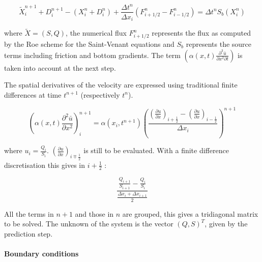\begin{equation}
 \tilde{X}^{n+1}_i + D_i^{n+1} - \left(X^n_i + D_i^n\right) + \frac{\Delta t^n}{\Delta x_i}\left(F^n_{i+1/2} - F^n_{i-1/2}\right) = \Delta t^n S_b(X^n_i) \label{eq:model_dis}
\end{equation}

\vspace{0.5cm}

where $\tilde{X}=(S,Q)$, the numerical flux $F^n_{i+1/2}$ represents the flux as computed by the Roe scheme for the Saint-Venant equations and $S_b$ represents the source terms including friction and bottom gradients.
The term $\left(\alpha(x,t)\frac{\partial^3{\bar{u}}}{\partial{{x}^2}\partial{t}}\right)$ is taken into account at the next step.

\vspace{0.5cm}

The spatial derivatives of the velocity are expressed using traditional finite differences at time $t^{n+1}$ (respectively $t^n$).

\begin{equation}
\left(\alpha(x,t)\frac{\partial^2{\bar{u}}}{\partial{{x}^2}}\right)^{n+1}_{i}
=\alpha(x_i,t^{n+1})\left(\frac{\displaystyle \left(\frac{\partial{u}}{\partial{x}}\right)_{i+\frac{1}{2}}-\left(\frac{\partial{u}}{\partial{x}}\right)_{i-\frac{1}{2}}}{\Delta{x_i}}\right)^{n+1}
\end{equation}

\vspace{0.5cm}

where $u_i=\frac{Q_i}{S_i}$. $\left(\frac{\partial{u}}{\partial{x}}\right)_{i\mp\frac{1}{2}}$ is still to be evaluated. With a finite difference discretisation this gives in $i+\frac{1}{2}$ :

\begin{equation}
\frac{\displaystyle \frac{Q_{i+1}}{S_{i+1}}-\frac{Q_i}{S_i}}{\displaystyle \frac{\Delta{x_i}+\Delta{x_{i+1}}}{2}}
\end{equation}

\vspace{0.5cm}

All the terms in $n+1$ and those in $n$ are grouped, this gives a tridiagonal matrix to be solved.
The unknown of the system is the vector $(Q,S)^T$, given by the prediction step. 


\paragraph{Boundary conditions\\}

